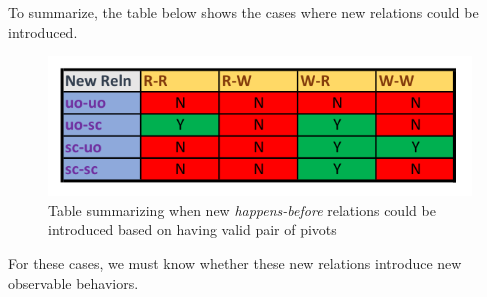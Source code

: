 

    To summarize, the table below shows the cases where new relations could be introduced. 
    \begin{figure}[H]
        \centering
        \includegraphics[scale=0.7]{Table2_Final.pdf}
        \caption{Table summarizing when new \textit{happens-before} relations could be introduced based on having valid pair of pivots }
        \label{fig:my_label}
    \end{figure}

    For these cases, we must know whether these new relations introduce new observable behaviors. 
